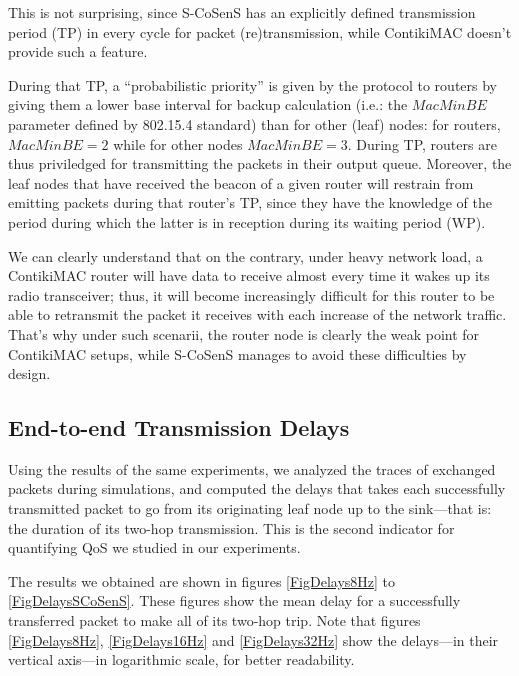 \documentclass[conference]{IEEEtran}
\begin{document}
This is not surprising, since S-CoSenS has an explicitly defined transmission
period (TP) in every cycle for packet (re)transmission, while ContikiMAC
doesn't provide such a feature.

During that TP, a ``probabilistic priority'' is given by the protocol to
routers by giving them a lower base interval for backup calculation
(i.e.: the $MacMinBE$ parameter defined by 802.15.4 standard) than
for other (leaf) nodes: for routers, $MacMinBE = 2$ while for
other nodes $MacMinBE = 3$. During TP, routers are thus priviledged
for transmitting the packets in their output queue. Moreover,
the leaf nodes that have received the beacon of a given router
will restrain from emitting packets during that router's TP,
since they have the knowledge of the period during which
the latter is in reception during its waiting period (WP).

We can clearly understand that on the contrary, under heavy network load,
a ContikiMAC router will have data to receive almost every time it wakes up
its radio transceiver; thus, it will become increasingly difficult for this
router to be able to retransmit the packet it receives with each increase
of the network traffic. That's why under such scenarii, the router node
is clearly the weak point for ContikiMAC setups, while S-CoSenS manages
to avoid these difficulties by design.



\subsection{End-to-end Transmission Delays}

Using the results of the same experiments, we analyzed the traces of
exchanged packets during simulations, and computed the delays that takes each
successfully transmitted packet to go from its originating leaf node up to
the sink---that is: the duration of its two-hop transmission.
This is the second indicator for quantifying QoS we studied
in our experiments.

The results we obtained are shown in figures \ref{FigDelays8Hz} to
\ref{FigDelaysSCoSenS}. These figures show the mean delay for
a successfully transferred packet to make all of its two-hop trip.
Note that figures \ref{FigDelays8Hz}, \ref{FigDelays16Hz} and
\ref{FigDelays32Hz} show the delays---in their vertical axis---in
logarithmic scale, for better readability.
\end{document}

